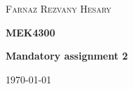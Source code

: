 \documentclass[main.tex]{subfiles}
\begin{document}
\begin{titlepage}
	\centering
	{\scshape\LARGE Farnaz Rezvany Hesary \par}
	\vspace{1.5cm}
	{\huge\bfseries MEK4300 \par}
	\vspace{1.5cm}
	{\huge\bfseries Mandatory assignment 2 \par}
	
	\vfill

	{\Large \today\par}
\end{titlepage}
\end{document}
